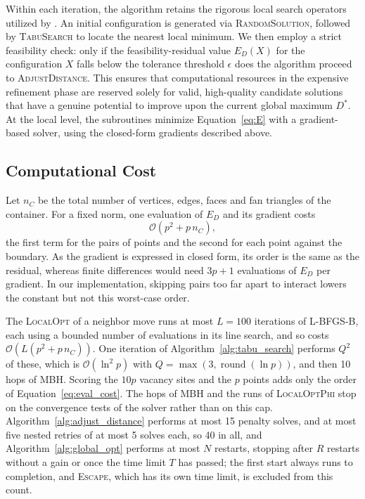 \documentclass[preprint,12pt]{elsarticle}
\theoremstyle{remark}
\begin{document}
Within each iteration, the algorithm retains the rigorous local search operators
utilized by \citet{lai2024}. An initial configuration is generated via
\textsc{RandomSolution}, followed by \textsc{TabuSearch} to locate the nearest
local minimum. We then employ a strict feasibility check: only if the
feasibility-residual value $E_D(X)$ for the configuration $X$ falls below the
tolerance threshold $\epsilon$ does the algorithm proceed to
\textsc{AdjustDistance}. This ensures that computational resources in the
expensive refinement phase are reserved solely for valid, high-quality candidate
solutions that have a genuine potential to improve upon the current global
maximum $D^*$. At the local level, the subroutines minimize Equation~\ref{eq:E}
with a gradient-based solver, using the closed-form gradients described above.

\subsection{Computational Cost}\label{sec:complexity}

Let $n_C$ be the total number of vertices, edges, faces and fan triangles of the
container. For a fixed norm, one evaluation of $E_D$ and its gradient costs
\begin{equation}
  \mathcal{O}(p^2 + p \, n_C),
  \label{eq:eval_cost}
\end{equation}
the first term for the pairs of points and the second for each point against the
boundary. As the gradient is expressed in closed form, its order is the same as
the residual, whereas finite differences would need $3p + 1$ evaluations of
$E_D$ per gradient. In our implementation, skipping pairs too far apart to
interact lowers the constant but not this worst-case order.

The \textsc{LocalOpt} of a neighbor move runs at most $L = 100$ iterations of
L-BFGS-B, each using a bounded number of evaluations in its line search, and so
costs $\mathcal{O}(L (p^2 + p \, n_C))$. One iteration of
Algorithm~\ref{alg:tabu_search} performs $Q^2$ of these, which is
$\mathcal{O}(\ln^2 p)$ with $Q = \max(3, \operatorname{round}(\ln p))$, and then
10 hops of \textsc{MBH}. Scoring the $10p$ vacancy sites and the $p$ points adds
only the order of Equation~\ref{eq:eval_cost}. The hops of \textsc{MBH} and the
runs of \textsc{LocalOptPhi} stop on the convergence tests of the solver rather
than on this cap. Algorithm~\ref{alg:adjust_distance} performs at most 15
penalty solves, and at most five nested retries of at most 5 solves each, so 40
in all, and Algorithm~\ref{alg:global_opt} performs at most $N$ restarts,
stopping after $R$ restarts without a gain or once the time limit $T$ has
passed; the first start always runs to completion, and \textsc{Escape}, which
has its own time limit, is excluded from this count.
\end{document}
